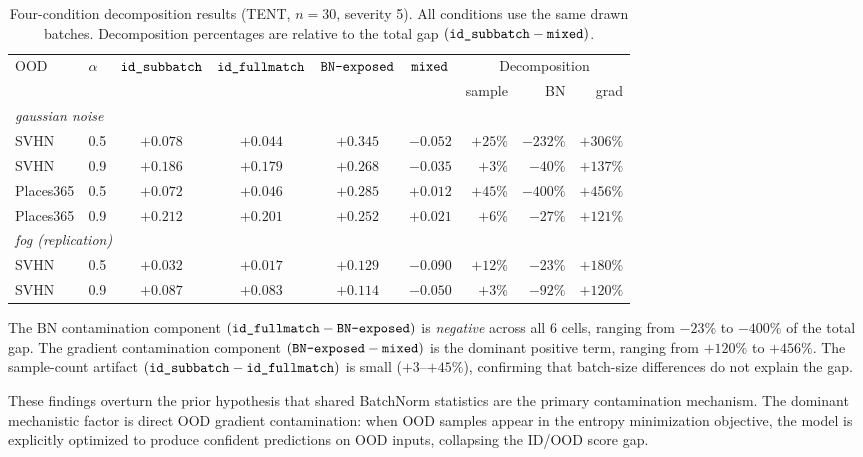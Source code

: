 \begin{table}[t]
\centering\small
\caption{%
  Four-condition decomposition results (TENT, $n{=}30$, severity 5).
  All conditions use the same drawn batches.
  Decomposition percentages are relative to the total gap $(\texttt{id\_subbatch} - \texttt{mixed})$.
}
\label{tab:decomp}
\begin{tabular}{llcccc r@{\,}r@{\,}r}
\toprule
OOD & $\alpha$ & $\texttt{id\_subbatch}$ & $\texttt{id\_fullmatch}$ & $\texttt{BN-exposed}$ & $\texttt{mixed}$ & \multicolumn{3}{c}{Decomposition} \\
    &          &          &           &       &          & sample & BN & grad \\
\midrule
\multicolumn{9}{l}{\textit{gaussian noise}} \\
SVHN & 0.5 & $+0.078$ & $+0.044$ & $+0.345$ & $-0.052$ & $+25\%$ & $-232\%$ & $+306\%$ \\
SVHN & 0.9 & $+0.186$ & $+0.179$ & $+0.268$ & $-0.035$ & $+3\%$  & $-40\%$  & $+137\%$ \\
Places365 & 0.5 & $+0.072$ & $+0.046$ & $+0.285$ & $+0.012$ & $+45\%$ & $-400\%$ & $+456\%$ \\
Places365 & 0.9 & $+0.212$ & $+0.201$ & $+0.252$ & $+0.021$ & $+6\%$  & $-27\%$  & $+121\%$ \\
\midrule
\multicolumn{9}{l}{\textit{fog (replication)}} \\
SVHN & 0.5 & $+0.032$ & $+0.017$ & $+0.129$ & $-0.090$ & $+12\%$ & $-23\%$ & $+180\%$ \\
SVHN & 0.9 & $+0.087$ & $+0.083$ & $+0.114$ & $-0.050$ & $+3\%$  & $-92\%$ & $+120\%$ \\
\bottomrule
\end{tabular}
\end{table}

The BN contamination component $(\texttt{id\_fullmatch} - \texttt{BN-exposed})$ is \emph{negative} across all 6 cells, ranging from $-23\%$ to $-400\%$ of the total gap.
The gradient contamination component $(\texttt{BN-exposed} - \texttt{mixed})$ is the dominant positive term, ranging from $+120\%$ to $+456\%$.
The sample-count artifact $(\texttt{id\_subbatch} - \texttt{id\_fullmatch})$ is small ($+3$--$+45\%$), confirming that batch-size differences do not explain the gap.

These findings overturn the prior hypothesis that shared BatchNorm statistics are the primary contamination mechanism.
The dominant mechanistic factor is direct OOD gradient contamination: when OOD samples appear in the entropy minimization objective, the model is explicitly optimized to produce confident predictions on OOD inputs, collapsing the ID/OOD score gap.

